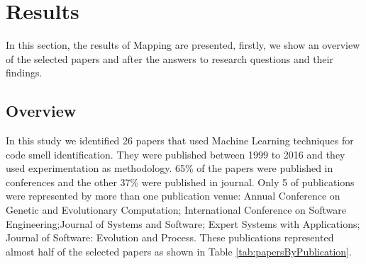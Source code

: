 \section{Results}



In this section, the results of Mapping are presented, firstly, we show an overview of the selected papers and after the answers to research questions and their findings.

\subsection{Overview}

In this study we identified 26 papers that used Machine Learning techniques for code smell identification. They were published between 1999 to 2016 and they used experimentation as methodology. 65\% of the papers were published in conferences and the other 37\% were published in journal. Only 5 of publications were represented by more than one publication venue: Annual Conference on Genetic and Evolutionary Computation; International Conference on Software Engineering;Journal of Systems and Software; Expert Systems with Applications; Journal of Software: Evolution and Process. These publications represented almost half of the selected papers as shown in Table \ref{tab:papersByPublication}.

